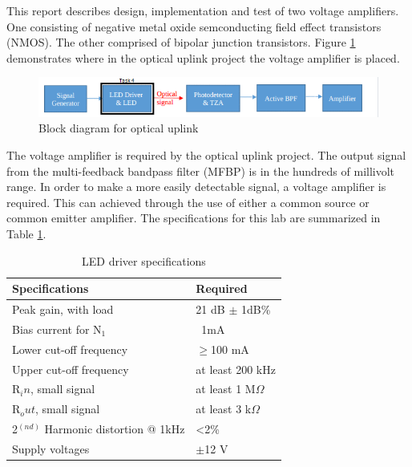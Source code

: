 




\noindent This report describes design, implementation and test of two voltage amplifiers. One consisting of negative metal oxide semconducting field effect transistors (NMOS). The other comprised of bipolar junction transistors. Figure \ref{fig:blockdiagram2} demonstrates where in the optical uplink project the voltage amplifier is placed. 


\begin{figure}[H]
    \centering
    \includegraphics[width=.9\textwidth ]{Introduction/Block_Diagram_MFBP.png}
    \caption{Block diagram for optical uplink \cite{b1}}
    \label{fig:blockdiagram2}
\end{figure}

The voltage amplifier is required by the optical uplink project. The output signal from the multi-feedback bandpass filter (MFBP) is in the hundreds of millivolt range. In order to make a more easily detectable signal, a voltage amplifier is required. This can achieved through the use of either a common source or common emitter amplifier. The specifications for this lab are summarized in Table \ref{tab:specifications}.

\begin{table}[H]
	\centering
	\caption{LED driver specifications}
	\label{tab:specifications}
	\begin{tabular}{|l|l|}
		\hline
		Specifications & Required       \\ \hline
		Peak gain, with load      & 21 dB $\pm$ 1dB\% \\ \hline
		Bias current for N$_1$     & ~1mA          \\ \hline
		Lower cut-off frequency      & $\geq$100 mA    \\ \hline
		Upper cut-off frequency    &  at least 200 kHz \\ \hline
		R$_in$, small signal       &  at least 1 M$\Omega$ \\ \hline
		R$_out$, small signal      &  at least 3 k$\Omega$ \\ \hline
		2$^(nd)$ Harmonic distortion @ 1kHz  & <2\% \\ \hline
		Supply voltages            &  $\pm$12 V
	\end{tabular}
\end{table}


